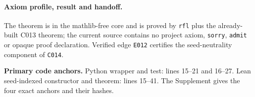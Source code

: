 \paragraph*{Axiom profile, result and handoff.}
The theorem is in the mathlib-free core and is proved by \texttt{rfl} plus the
already-built C013 theorem; the current source contains no project axiom,
\texttt{sorry}, \texttt{admit} or opaque proof declaration.  Verified edge
\texttt{E012} certifies the seed-neutrality component of \texttt{C014}.

\noindent\textbf{Primary code anchors.}
Python wrapper and test: lines 15--21 and 16--27.  Lean seed-indexed constructor
and theorem: lines 15--41.  The Supplement gives the four exact anchors and
their hashes.

